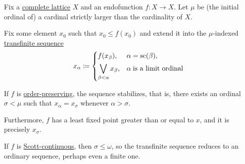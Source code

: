 \begin{theorem}\label{thm:knaster_tarski_iteration}
  Fix a \hyperref[def:complete_lattice]{complete lattice} \( X \) and an endofunction \( f: X \to X \). Let \( \mu \) be (the initial ordinal of) a cardinal strictly larger than the cardinality of \( X \).

  Fix some element \( x_0 \) such that \( x_0 \leq f(x_0) \) and extend it into the \( \mu \)-indexed \hyperref[def:transfinite_sequence]{transfinite sequence}
  \begin{equation*}
    x_\alpha \coloneqq \begin{dcases}
      f(x_\beta),                       &\alpha = \op{sc}(\beta), \\
      \bigvee_{\beta < \alpha} x_\beta, &\alpha \T{is a limit ordinal} \\
    \end{dcases}
  \end{equation*}

  \begin{thmenum}
     If \( f \) is \hyperref[def:order_function]{order-preserving}, the sequence stabilizes, that is, there exists an ordinal \( \sigma < \mu \) such that \( x_\alpha = x_\sigma \) whenever \( \alpha > \sigma \).

     Furthermore, \( f \) has a least fixed point greater than or equal to \( x \), and it is precisely \( x_\sigma \).

     If \( f \) is \hyperref[def:scott_continuous]{Scott-continuous}, then \( \sigma \leq \omega \), so the transfinite sequence reduces to an ordinary sequence, perhaps even a finite one.
  \end{thmenum}
\end{theorem}
